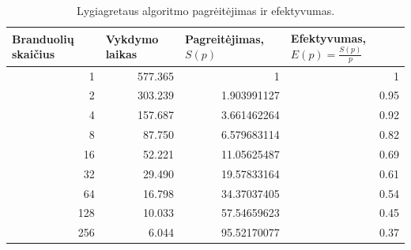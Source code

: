 \documentclass{VUMIFPSbakalaurinis}
\begin{document}
\begin{table}[]
    \begin{tabular}{|r|r|r|r|}
        \hline
        \multicolumn{1}{|l|}{Branduolių skaičius} & \multicolumn{1}{l|}{Vykdymo laikas} & \multicolumn{1}{l|}{Pagreitėjimas, $S(p)$} & \multicolumn{1}{l|}{Efektyvumas, $E(p)=\frac{S(p)}{p}$} \\ \hline
        1                                         & 577.365                             & 1                                          & 1                                                       \\ \hline
        2                                         & 303.239                             & 1.903991127                                & 0.95                                                    \\ \hline
        4                                         & 157.687                             & 3.661462264                                & 0.92                                                    \\ \hline
        8                                         & 87.750                              & 6.579683114                                & 0.82                                                    \\ \hline
        16                                        & 52.221                              & 11.05625487                                & 0.69                                                    \\ \hline
        32                                        & 29.490                              & 19.57833164                                & 0.61                                                    \\ \hline
        64                                        & 16.798                              & 34.37037405                                & 0.54                                                    \\ \hline
        128                                       & 10.033                              & 57.54659623                                & 0.45                                                    \\ \hline
        256                                       & 6.044                               & 95.52170077                                & 0.37                                                    \\ \hline
    \end{tabular}
    \caption{Lygiagretaus algoritmo pagrėitėjimas ir efektyvumas. }
    \label{table:speedup}
\end{table}
\end{document}
